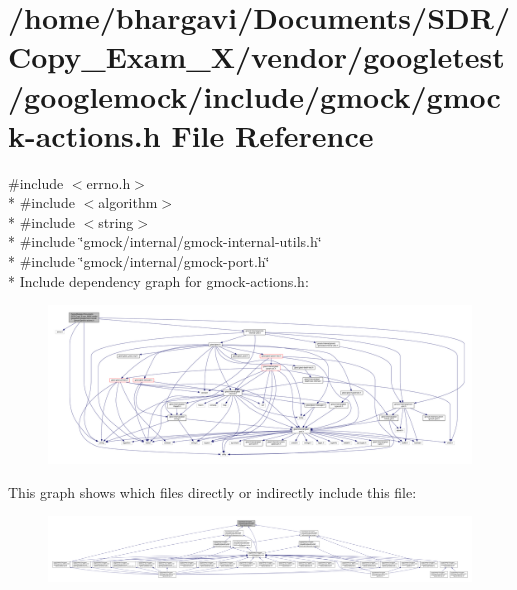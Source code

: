 \hypertarget{gmock-actions_8h}{}\section{/home/bhargavi/\+Documents/\+S\+D\+R/\+Copy\+\_\+\+Exam\+\_\+X/vendor/googletest/googlemock/include/gmock/gmock-\/actions.h File Reference}
\label{gmock-actions_8h}
{\ttfamily \#include $<$errno.\+h$>$}\\*
{\ttfamily \#include $<$algorithm$>$}\\*
{\ttfamily \#include $<$string$>$}\\*
{\ttfamily \#include \char`\"{}gmock/internal/gmock-\/internal-\/utils.\+h\char`\"{}}\\*
{\ttfamily \#include \char`\"{}gmock/internal/gmock-\/port.\+h\char`\"{}}\\*
Include dependency graph for gmock-\/actions.h\+:
\nopagebreak
\begin{figure}[H]
\begin{center}
\leavevmode
\includegraphics[width=350pt]{gmock-actions_8h__incl}
\end{center}
\end{figure}
This graph shows which files directly or indirectly include this file\+:
\nopagebreak
\begin{figure}[H]
\begin{center}
\leavevmode
\includegraphics[width=350pt]{gmock-actions_8h__dep__incl}
\end{center}
\end{figure}
